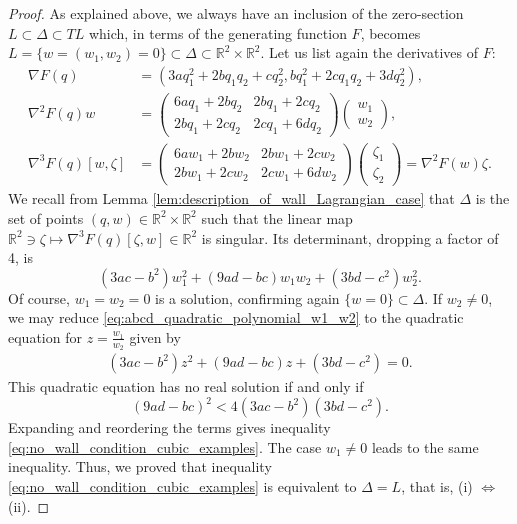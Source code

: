 \documentclass[12pt]{article}
\newcommand{\R}{{\mathbb R}}
\begin{document}
\begin{proof}
As explained above, we always have an inclusion of the zero-section $L\subset\Delta\subset TL$ which, in terms of the generating function $F$, becomes $L=\{w=(w_1,w_2)=0\}\subset\Delta\subset\R^2\times\R^2$. Let us list again the derivatives of $F$:
\begin{equation}\nonumber
\begin{aligned}
\nabla F(q)&=(3aq_1^2+2bq_1q_2+cq_2^2,bq_1^2+2cq_1q_2+3dq_2^2),\\[2ex]
\nabla^2F(q)w%
&=
\begin{pmatrix}
6aq_1+2bq_2 & 2bq_1+2cq_2\\
2bq_1+2cq_2 & 2cq_1+6dq_2
\end{pmatrix}
\begin{pmatrix}
w_1\\
w_2
\end{pmatrix},\\[2ex]
\nabla^3F(q)[w,\zeta]&=
\begin{pmatrix}
6aw_1+2bw_2 & 2bw_1+2cw_2\\
2bw_1+2cw_2 & 2cw_1+6dw_2
\end{pmatrix}
\begin{pmatrix}
\zeta_1\\
\zeta_2
\end{pmatrix}
=\nabla^2F(w)\zeta.
\end{aligned}
\end{equation}
We recall from Lemma \ref{lem:description_of_wall_Lagrangian_case} that $\Delta$ is the set of points $(q,w)\in\R^2\times\R^2$ such that the linear map $\R^2\ni\zeta\mapsto \nabla^3F(q)[\zeta,w]\in\R^2$ is singular. Its determinant, dropping a factor of 4, is
\begin{equation}\label{eq:abcd_quadratic_polynomial_w1_w2}
(3ac-b^2)w_1^2+(9ad-bc)w_1w_2+(3bd-c^2)w_2^2.
\end{equation}
%
Of course, $w_1=w_2=0$ is a solution, confirming again $\{w=0\}\subset\Delta$. If $w_2\neq0$, we may reduce \eqref{eq:abcd_quadratic_polynomial_w1_w2} to the quadratic equation for $z=\frac{w_1}{w_2}$ given by
\begin{equation*} 
\begin{aligned}
(3ac-b^2)z^2+(9ad-bc)z+(3bd-c^2)=0.
\end{aligned}
\end{equation*}
This quadratic equation has no real solution if and only if
\begin{equation*}\label{eq:abcd_quadratic_polynomial_inequality}
(9ad-bc)^2<4(3ac-b^2)(3bd-c^2).
\end{equation*}
Expanding and reordering the terms gives inequality \eqref{eq:no_wall_condition_cubic_examples}. The case $w_1\neq0$ leads to the same inequality. Thus, we proved that inequality \eqref{eq:no_wall_condition_cubic_examples} is equivalent to $\Delta=L$, that is, (i) $\Longleftrightarrow$ (ii). 


\end{proof}
\end{document}

